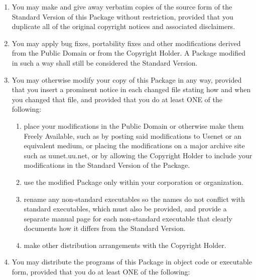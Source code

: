 \begin{enumerate}

\item You may make and give away verbatim copies of the source form of the
Standard Version of this Package without restriction, provided that you
duplicate all of the original copyright notices and associated disclaimers.

\item You may apply bug fixes, portability fixes and other modifications
derived from the Public Domain or from the Copyright Holder.  A Package
modified in such a way shall still be considered the Standard Version.

\item You may otherwise modify your copy of this Package in any way, provided
that you insert a prominent notice in each changed file stating how and
when you changed that file, and provided that you do at least ONE of the
following:

\begin{enumerate}

    \item place your modifications in the Public Domain or otherwise make them
    Freely Available, such as by posting said modifications to Usenet or
    an equivalent medium, or placing the modifications on a major archive
    site such as uunet.uu.net, or by allowing the Copyright Holder to include
    your modifications in the Standard Version of the Package.

    \item use the modified Package only within your corporation or organization.

    \item rename any non-standard executables so the names do not conflict
    with standard executables, which must also be provided, and provide
    a separate manual page for each non-standard executable that clearly
    documents how it differs from the Standard Version.

    \item make other distribution arrangements with the Copyright Holder.

\end{enumerate}

\item You may distribute the programs of this Package in object code or
executable form, provided that you do at least ONE of the following:

\begin{enumerate}


\end{enumerate}
\end{enumerate}
